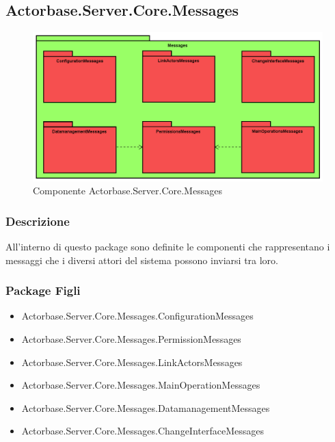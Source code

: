 \documentclass[a4paper]{article}
\begin{document}
		\subsection{Actorbase.Server.Core.Messages}
			\begin{figure} [H]
			\centering
			\includegraphics[scale=0.55]{Server/Package/MessagesLevel.png}
			\caption{Componente Actorbase.Server.Core.Messages}
			\end{figure}
			\subsubsection{Descrizione}
				All'interno di questo package sono definite le componenti che rappresentano i messaggi che i diversi attori del sistema possono inviarsi tra loro.
			\subsubsection{Package Figli}
			\begin{itemize}
				\item Actorbase.Server.Core.Messages.ConfigurationMessages
				\item Actorbase.Server.Core.Messages.PermissionMessages
				\item Actorbase.Server.Core.Messages.LinkActorsMessages
				\item Actorbase.Server.Core.Messages.MainOperationMessages
				\item Actorbase.Server.Core.Messages.DatamanagementMessages
				\item Actorbase.Server.Core.Messages.ChangeInterfaceMessages
			\end{itemize}
			
\end{document}
